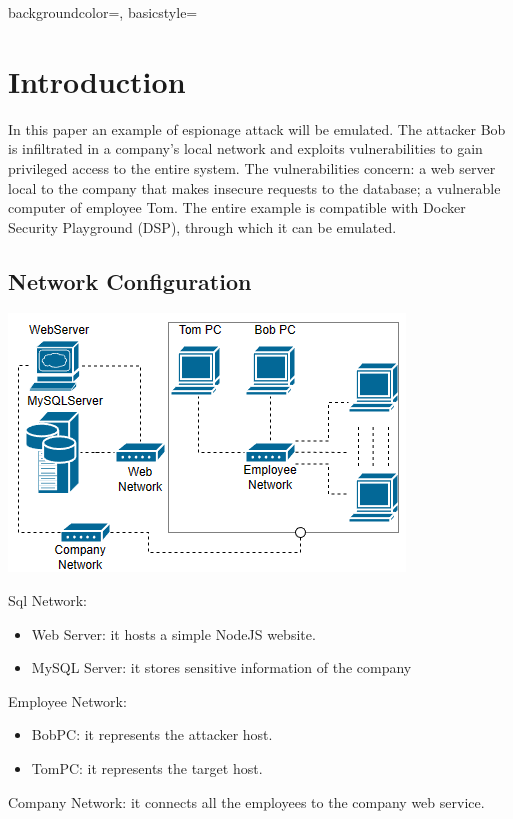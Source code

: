 \documentclass[a4paper, 12pt, oneside]{extbook}
\begin{document}

\frontmatter

{
\tableofcontents
}

{ 
    backgroundcolor=\color{black},
    basicstyle=\color{white}
}


\mainmatter




\chapter{Introduction}
In this paper an example of espionage attack will be emulated. 
The attacker Bob is infiltrated in a company's local network and exploits vulnerabilities to gain privileged access to the entire system.
The vulnerabilities concern: a web server local to the company that makes insecure requests to the database; a vulnerable computer of employee Tom.
The entire example is compatible with Docker Security Playground (DSP), through which it can be emulated.
\section{Network Configuration}
\begin{center}
\includegraphics[scale=1]{../Image/network.PNG}
\end{center}
Sql Network: 
\begin{itemize}
  \item Web Server: it hosts a simple NodeJS website.
  \item MySQL Server: it stores sensitive information of the company
\end{itemize} 
Employee Network: 
\begin{itemize}
  \item BobPC: it represents the attacker host.
  \item TomPC: it represents the target host.
\end{itemize} 
Company Network: it connects all the employees to the company web service.
\end{document}
